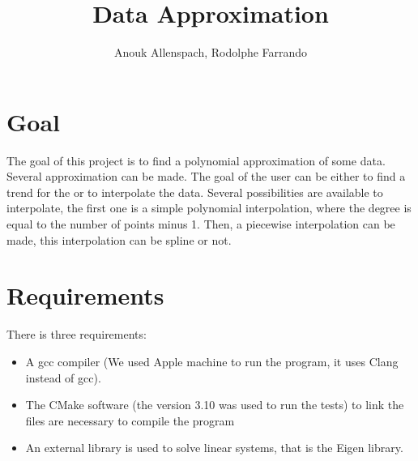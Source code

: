 \documentclass[12pt]{article}
\begin{document}
 
\title{Data Approximation}
\author{Anouk Allenspach, Rodolphe Farrando}  
\maketitle
 

\section{Goal}
The goal of this project is to find a polynomial approximation of some data. Several approximation can be made. The goal of the user can be either to find a trend for the or to interpolate the data. Several possibilities are available to interpolate, the first one is a simple polynomial interpolation, where the degree is equal to the number of points minus 1. Then, a piecewise interpolation can be made, this interpolation can be spline or not.

\section{Requirements}
There is three requirements:
\begin{itemize}
\item A gcc compiler (We used Apple machine to run the program, it uses Clang instead of gcc).
\item The CMake software (the version 3.10 was used to run the tests) to link the files are necessary to compile the program
\item An external library is used to solve linear systems, that is the Eigen library.
\end{itemize}
\end{document}
